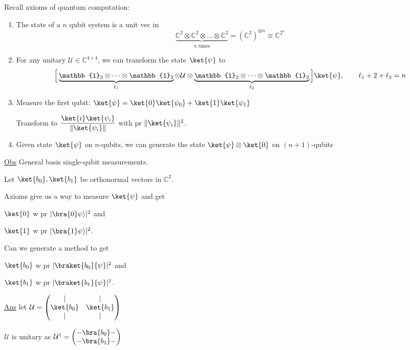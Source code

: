 \documentclass[11pt]{article}
\begin{document}
Recall axioms of quantum computation:
\begin{enumerate}
    \item[\textcircled{1}] The state of a $n$ qubit system is a unit vec in
    \[
    \underbrace{\mathbb{C}^2 \otimes \mathbb{C}^2 \otimes \dots \otimes \mathbb{C}^2}_{n \text{ times}} = (\mathbb{C}^2)^{\otimes n} \cong \mathbb{C}^{2^n}
    \]
    \item[\textcircled{2}] For any unitary $\mathcal{U} \in \mathbb{C}^{4\times4}$, we can transform the state $\ket{\psi}$ to
    \[
    \Big[\underbrace{\mathbb{1}_2 \otimes \dots \otimes \mathbb{1}_2}_{\ell_1} \otimes \mathcal{U} \otimes \underbrace{\mathbb{1}_2\otimes\dots\otimes\mathbb{1}_2}_{\ell_2}\Big]\ket{\psi}, \qquad \ell_1 + 2 + \ell_2 = n
    \]
    \item[\textcircled{3}] Measure the first qubit: $\ket{\psi} = \ket{0}\ket{\psi_0} + \ket{1}\ket{\psi_1}$

    Transform to $\dfrac{\ket{i}\ket{\psi_i}}{\|\ket{\psi_i}\|}$ with pr $\|\ket{\psi_i}\|^2$.

    \item[\textcircled{4}] Given state $\ket{\psi}$ on $n$-qubits, we can generate the state $\ket{\psi}\otimes\ket{0}$ on $(n+1)$-qubits
\end{enumerate}

\underline{Obs} General basis single-qubit measurements.

Let $\ket{b_0},\ket{b_1}$ be orthonormal vectors in $\mathbb{C}^2$.

Axioms give us a way to measure $\ket{\psi}$ and get

$\ket{0}$ w pr $|\bra{0}\psi\rangle|^2$ and

$\ket{1}$ w pr $|\bra{1}\psi\rangle|^2$.

Can we generate a method to get

$\ket{b_0}$ w pr $|\braket{b_0}{\psi}|^2$ and

$\ket{b_1}$ w pr $|\braket{b_1}{\psi}|^2$.

\underline{Ans} let $\mathcal{U} = \begin{pmatrix} | & | \\ \ket{b_0} & \ket{b_1} \\ | & | \end{pmatrix}$

$\mathcal{U}$ is unitary as $\mathcal{U}^\dagger = \begin{pmatrix} -\bra{b_0}- \\ -\bra{b_1}- \end{pmatrix}$
\end{document}
